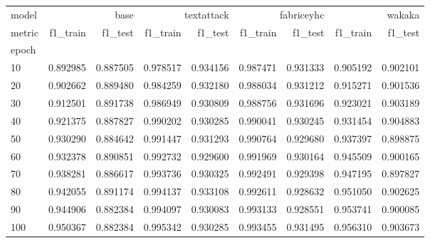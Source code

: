 \begin{tabular}{lrrrrrrrr}
model & \multicolumn{2}{r}{base} & \multicolumn{2}{r}{textattack} & \multicolumn{2}{r}{fabriceyhc} & \multicolumn{2}{r}{wakaka} \\
metric & f1_train & f1_test & f1_train & f1_test & f1_train & f1_test & f1_train & f1_test \\
epoch &  &  &  &  &  &  &  &  \\
10 & 0.892985 & 0.887505 & 0.978517 & 0.934156 & 0.987471 & 0.931333 & 0.905192 & 0.902101 \\
20 & 0.902662 & 0.889480 & 0.984259 & 0.932180 & 0.988034 & 0.931212 & 0.915271 & 0.901536 \\
30 & 0.912501 & 0.891738 & 0.986949 & 0.930809 & 0.988756 & 0.931696 & 0.923021 & 0.903189 \\
40 & 0.921375 & 0.887827 & 0.990202 & 0.930285 & 0.990041 & 0.930245 & 0.931454 & 0.904883 \\
50 & 0.930290 & 0.884642 & 0.991447 & 0.931293 & 0.990764 & 0.929680 & 0.937397 & 0.898875 \\
60 & 0.932378 & 0.890851 & 0.992732 & 0.929600 & 0.991969 & 0.930164 & 0.945509 & 0.900165 \\
70 & 0.938281 & 0.886617 & 0.993736 & 0.930325 & 0.992491 & 0.929398 & 0.947195 & 0.897827 \\
80 & 0.942055 & 0.891174 & 0.994137 & 0.933108 & 0.992611 & 0.928632 & 0.951050 & 0.902625 \\
90 & 0.944906 & 0.882384 & 0.994097 & 0.930083 & 0.993133 & 0.928551 & 0.953741 & 0.900085 \\
100 & 0.950367 & 0.882384 & 0.995342 & 0.930285 & 0.993455 & 0.931495 & 0.956310 & 0.903673 \\
\end{tabular}
